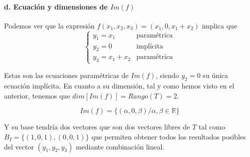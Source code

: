 \begin{problema}{\cite[10p346]{palacios}}
	\paragraph{d. Ecuación y dimensiones de $Im(f)$} Podemos ver que la expresión
	$f(x_1,x_2,x_3)=(x_1,0,x_1+x_2)$ implica que
	$$
	\begin{cases}
		y_1 = x_1		& \text{paramétrica} \\
		y_2 = 0 		& \text{implícita} \\
		y_3 = x_1+x_2 	& \text{paramétrica}
	\end{cases}
	$$

	Estas son las ecuaciones paramétricas de $Im(f)$, siendo $y_2=0$ su única ecuación implícita.
	En cuanto a su dimensión, tal y como hemos visto en el anterior, tenemos que 
	$dim[Im(f)]=Rango(T)=2$.

	$$Im(f)=\{(\alpha, 0, \beta) / \alpha,\beta \in \mathbb{R}\}$$

	Y su base tendría dos vectores que son dos vectores libres de $T$ tal como
	$B_I=\{(1,0,1),(0,0,1)\}$ que permiten obtener todos los resultados posibles del vector 
	$(y_1,y_2,y_3)$ mediante combinación lineal.
\end{problema}

